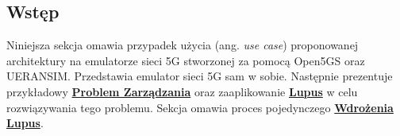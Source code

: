 \subsection{Wstęp}

Niniejsza sekcja omawia przypadek użycia (ang. \textit{use case}) proponowanej architektury na emulatorze sieci 5G stworzonej za pomocą Open5GS oraz UERANSIM. Przedstawia emulator sieci 5G sam w sobie. Następnie prezentuje przykładowy \hyperlink{def:problem-zarzadzania}{\textbf{Problem Zarządzania}} oraz zaaplikowanie \hyperlink{def:lupus}{\textbf{Lupus}} w celu rozwiązywania tego problemu. Sekcja omawia proces pojedynczego \hyperlink{def:wdrozenie-lupus}{\textbf{Wdrożenia Lupus}}.
